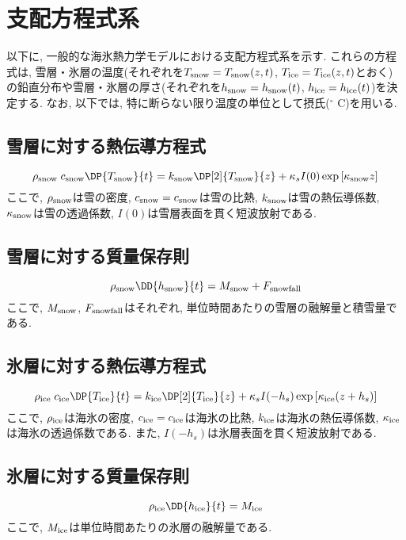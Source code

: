 \section{支配方程式系}
以下に, 一般的な海氷熱力学モデルにおける支配方程式系を示す.
これらの方程式は, 雪層・氷層の温度(それぞれを$T_{\rm snow}=T_{\rm snow}(z,t)$, $T_{\rm ice}=T_{\rm ice}(z,t)$とおく)
の鉛直分布や雪層・氷層の厚さ(それぞれを$h_{\rm snow}=h_{\rm snow}(t)$, $h_{\rm ice}=h_{\rm ice}(t)$)を決定する. 
なお, 以下では, 特に断らない限り温度の単位として摂氏($^\circ$ C)を用いる. 
\subsection*{雪層に対する熱伝導方程式}
\begin{equation}
 \rho_{\rm snow} \; c_{\rm snow} \DP{T_{\rm snow}}{t}
  = k_{\rm snow} \DP[2]{T_{\rm snow}}{z}
    + \kappa_s I(0) \exp{[\kappa_{\rm snow} z]}
\end{equation}
ここで, $\rho_{\rm snow}$は雪の密度, $c_{\rm snow}=c_{\rm snow}$は雪の比熱,
$k_{\rm snow}$は雪の熱伝導係数, $\kappa_{\rm snow}$は雪の透過係数, 
$I(0)$は雪層表面を貫く短波放射である.

\subsection*{雪層に対する質量保存則}
\begin{equation}
  \rho_{\rm snow} \DD{h_{\rm snow}}{t} = M_{\rm snow} + F_{\rm snowfall}
\end{equation}
ここで, $M_{\rm snow}$, $F_{\rm snowfall}$はそれぞれ, 単位時間あたりの雪層の融解量と積雪量である. 

\subsection*{氷層に対する熱伝導方程式}
\begin{equation}
 \rho_{\rm ice} \; c_{\rm ice} \DP{T_{\rm ice}}{t}
  = k_{\rm ice} \DP[2]{T_{\rm ice}}{z}
    + \kappa_s I(-h_s) \exp{[\kappa_{\rm ice} (z + h_s)]}
\end{equation}
ここで, $\rho_{\rm ice}$は海氷の密度, $c_{\rm ice}=c_{\rm ice}$は海氷の比熱,
$k_{\rm ice}$は海氷の熱伝導係数, $\kappa_{\rm ice}$は海氷の透過係数である.
また, $I(-h_s)$は氷層表面を貫く短波放射である.

\subsection*{氷層に対する質量保存則}
\begin{equation}
  \rho_{\rm ice} \DD{h_{\rm ice}}{t} = M_{\rm ice}
\end{equation}
ここで, $M_{\rm ice}$は単位時間あたりの氷層の融解量である.

